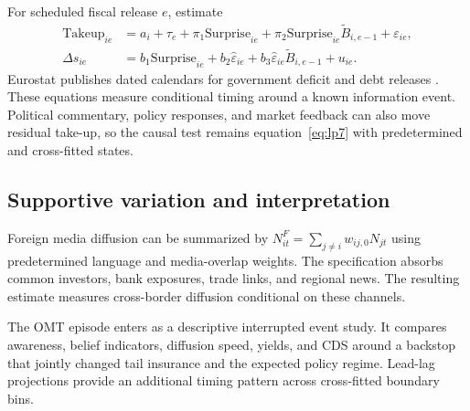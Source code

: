 \documentclass[11pt]{article}
\theoremstyle{definition}
\begin{document}
For scheduled fiscal release $e$, estimate
\begin{align}
\mathrm{Takeup}_{ie}&=a_i+\tau_e+\pi_1\mathrm{Surprise}_{ie}
+\pi_2\mathrm{Surprise}_{ie}\widetilde B_{i,e-1}+\varepsilon_{ie},
\label{eq:takeup7}\\
\Delta s_{ie}&=b_1\mathrm{Surprise}_{ie}+b_2\widehat\varepsilon_{ie}
+b_3\widehat\varepsilon_{ie}\widetilde B_{i,e-1}+u_{ie}.
\label{eq:release7}
\end{align}
Eurostat publishes dated calendars for government deficit and debt releases \citep{EurostatCalendar}. These equations measure conditional timing around a known information event. Political commentary, policy responses, and market feedback can also move residual take-up, so the causal test remains equation~\eqref{eq:lp7} with predetermined and cross-fitted states.

\subsection{Supportive variation and interpretation}

Foreign media diffusion can be summarized by $N_{it}^{F}=\sum_{j\neq i}w_{ij,0}N_{jt}$ using predetermined language and media-overlap weights. The specification absorbs common investors, bank exposures, trade links, and regional news. The resulting estimate measures cross-border diffusion conditional on these channels.

The OMT episode enters as a descriptive interrupted event study. It compares awareness, belief indicators, diffusion speed, yields, and CDS around a backstop that jointly changed tail insurance and the expected policy regime. Lead-lag projections provide an additional timing pattern across cross-fitted boundary bins.
\end{document}
